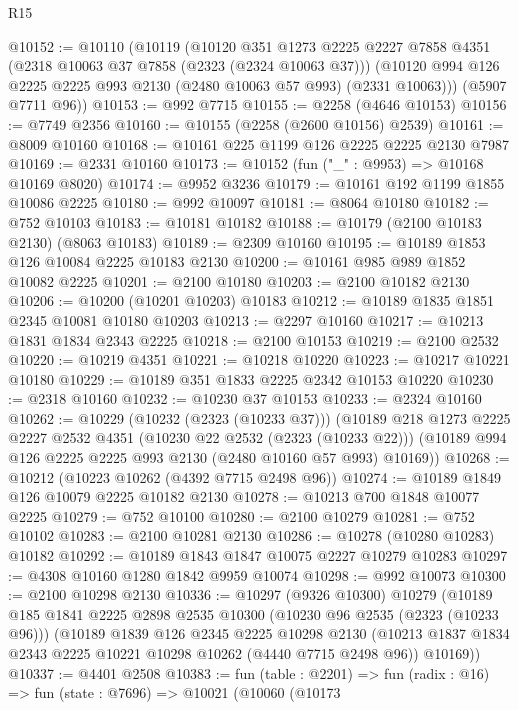 \begin{lexlean}{R15}
\begin{coremodule}
@10152 := @10110
    (@10119
      (@10120
        @351
        @1273
        @2225
        @2227
        @7858
        @4351
        (@2318 @10063 @37 @7858 (@2323 (@2324 @10063 @37)))
        (@10120 @994 @126 @2225 @2225 @993 @2130 (@2480 @10063 @57 @993) (@2331 @10063)))
      (@5907 @7711 @96))
@10153 := @992 @7715
@10155 := @2258 (@4646 @10153)
@10156 := @7749 @2356
@10160 := @10155 (@2258 (@2600 @10156) @2539)
@10161 := @8009 @10160
@10168 := @10161 @225 @1199 @126 @2225 @2225 @2130 @7987
@10169 := @2331 @10160
@10173 := @10152 (fun ("_" : @9953) => @10168 @10169 @8020)
@10174 := @9952 @3236
@10179 := @10161 @192 @1199 @1855 @10086 @2225
@10180 := @992 @10097
@10181 := @8064 @10180
@10182 := @752 @10103
@10183 := @10181 @10182
@10188 := @10179 (@2100 @10183 @2130) (@8063 @10183)
@10189 := @2309 @10160
@10195 := @10189 @1853 @126 @10084 @2225 @10183 @2130
@10200 := @10161 @985 @989 @1852 @10082 @2225
@10201 := @2100 @10180
@10203 := @2100 @10182 @2130
@10206 := @10200 (@10201 @10203) @10183
@10212 := @10189 @1835 @1851 @2345 @10081 @10180 @10203
@10213 := @2297 @10160
@10217 := @10213 @1831 @1834 @2343 @2225
@10218 := @2100 @10153
@10219 := @2100 @2532
@10220 := @10219 @4351
@10221 := @10218 @10220
@10223 := @10217 @10221 @10180
@10229 := @10189 @351 @1833 @2225 @2342 @10153 @10220
@10230 := @2318 @10160
@10232 := @10230 @37 @10153
@10233 := @2324 @10160
@10262 := @10229
    (@10232 (@2323 (@10233 @37)))
    (@10189
      @218
      @1273
      @2225
      @2227
      @2532
      @4351
      (@10230 @22 @2532 (@2323 (@10233 @22)))
      (@10189 @994 @126 @2225 @2225 @993 @2130 (@2480 @10160 @57 @993) @10169))
@10268 := @10212 (@10223 @10262 (@4392 @7715 @2498 @96))
@10274 := @10189 @1849 @126 @10079 @2225 @10182 @2130
@10278 := @10213 @700 @1848 @10077 @2225
@10279 := @752 @10100
@10280 := @2100 @10279
@10281 := @752 @10102
@10283 := @2100 @10281 @2130
@10286 := @10278 (@10280 @10283) @10182
@10292 := @10189 @1843 @1847 @10075 @2227 @10279 @10283
@10297 := @4308 @10160 @1280 @1842 @9959 @10074
@10298 := @992 @10073
@10300 := @2100 @10298 @2130
@10336 := @10297
    (@9326 @10300)
    @10279
    (@10189
      @185
      @1841
      @2225
      @2898
      @2535
      @10300
      (@10230 @96 @2535 (@2323 (@10233 @96)))
      (@10189
        @1839
        @126
        @2345
        @2225
        @10298
        @2130
        (@10213 @1837 @1834 @2343 @2225 @10221 @10298 @10262 (@4440 @7715 @2498 @96))
        @10169))
@10337 := @4401 @2508
@10383 := fun (table : @2201) =>
  fun (radix : @16) =>
  fun (state : @7696) =>
  @10021
    (@10060
      (@10173

\end{coremodule}
\end{lexlean}
